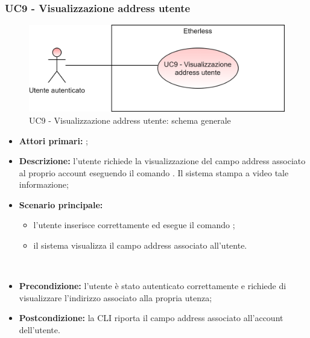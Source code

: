 \subsubsection{UC9 - Visualizzazione address utente}
\begin{figure}[h]
	\centering
	\includegraphics[scale=\ucs]{./res/img/UC9G.png}
	\caption {UC9 - Visualizzazione address utente: schema generale}
\end{figure}
\begin{itemize}
	\item \textbf{Attori primari:} \ua{};
	\item \textbf{Descrizione:} l’utente richiede la visualizzazione del campo address associato al proprio account eseguendo il comando \whoami{}. Il sistema stampa a video tale informazione; 
	\item \textbf{Scenario principale:} 
		\begin{itemize}
			\item l'utente inserisce correttamente ed esegue il comando \whoami{}; 
			\item il sistema visualizza il campo address associato all’utente.
		\end{itemize}  
	\item \textbf{Precondizione:} l’utente è stato autenticato correttamente e richiede di visualizzare l’indirizzo associato alla propria utenza;
	\item \textbf{Postcondizione:} la CLI riporta il campo address associato all’account dell’utente.
\end{itemize}